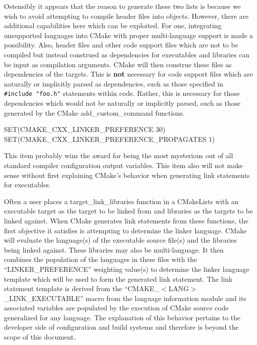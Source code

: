 \documentclass[12pt,letterpaper]{article}
\begin{document}
Ostensibly it appears that the reason to generate these two lists is because we wish to avoid attempting to compile header files into objects.  However, there are additional capabilities here which can be exploited.  For one, integrating unsupported languages into CMake with proper multi-language support is made a possibility.  Also, header files and other code support files which are not to be compiled but instead construed as dependencies for executables and libraries can be input as compilation arguments.  CMake will then construe these files as dependencies of the targets.  This is \textbf{not} necessary for code support files which are naturally or implicitly parsed as dependencies, such as those specified in \verb|#include "foo.h"| statements within code.  Rather, this is necessary for those dependencies which would not be naturally or implicitly parsed, such as those generated by the CMake add\_custom\_command functions.

\begin{shaded}
\noindent SET(CMAKE\_CXX\_LINKER\_PREFERENCE 30)\\
SET(CMAKE\_CXX\_LINKER\_PREFERENCE\_PROPAGATES 1)
\end{shaded}

This item probably wins the award for being the most mysterious out of all standard compiler configuration output variables.  This item also will not make sense without first explaining CMake's behavior when generating link statements for executables.

Often a user places a target\_link\_libraries function in a CMakeLists with an executable target as the target to be linked from and libraries as the targets to be linked against.  When CMake generates link statements from these functions, the first objective it satisfies is attempting to determine the linker language.  CMake will evaluate the language(s) of the executable source file(s) and the libraries being linked against.  These libraries may also be multi-language.  It then combines the population of the languages in these files with the ``LINKER\_PREFERENCE'' weighting value(s) to determine the linker language template which will be used to form the generated link statement.  The link statement template is derived from the ``CMAKE\_$<$LANG$>$\_LINK\_EXECUTABLE'' macro from the language information module and its associated variables are populated by the execution of CMake source code generalized for any language.  The explanation of this behavior pertains to the developer side of configuration and build systems and therefore is beyond the scope of this document.
\end{document}
